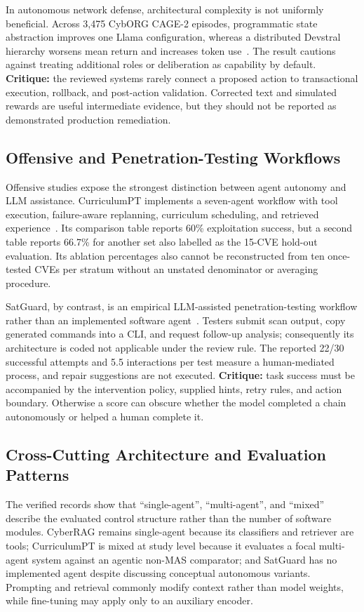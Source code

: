 In autonomous network defense, architectural complexity is not uniformly beneficial. Across 3,475 CybORG CAGE-2 episodes, programmatic state abstraction improves one Llama configuration, whereas a distributed Devstral hierarchy worsens mean return and increases token use~\cite{R0484_Bogdanov_2026}. The result cautions against treating additional roles or deliberation as capability by default. \textbf{Critique:} the reviewed systems rarely connect a proposed action to transactional execution, rollback, and post-action validation. Corrected text and simulated rewards are useful intermediate evidence, but they should not be reported as demonstrated production remediation.

\subsection{Offensive and Penetration-Testing Workflows}

Offensive studies expose the strongest distinction between agent autonomy and LLM assistance. CurriculumPT implements a seven-agent workflow with tool execution, failure-aware replanning, curriculum scheduling, and retrieved experience~\cite{R0322_Wu_2025}. Its comparison table reports 60\% exploitation success, but a second table reports 66.7\% for another set also labelled as the 15-CVE hold-out evaluation. Its ablation percentages also cannot be reconstructed from ten once-tested CVEs per stratum without an unstated denominator or averaging procedure.

SatGuard, by contrast, is an empirical LLM-assisted penetration-testing workflow rather than an implemented software agent~\cite{R0384_Xiao_2025}. Testers submit scan output, copy generated commands into a CLI, and request follow-up analysis; consequently its architecture is coded not applicable under the review rule. The reported 22/30 successful attempts and 5.5 interactions per test measure a human-mediated process, and repair suggestions are not executed. \textbf{Critique:} task success must be accompanied by the intervention policy, supplied hints, retry rules, and action boundary. Otherwise a score can obscure whether the model completed a chain autonomously or helped a human complete it.

\subsection{Cross-Cutting Architecture and Evaluation Patterns}

The verified records show that ``single-agent'', ``multi-agent'', and ``mixed'' describe the evaluated control structure rather than the number of software modules. CyberRAG remains single-agent because its classifiers and retriever are tools; CurriculumPT is mixed at study level because it evaluates a focal multi-agent system against an agentic non-MAS comparator; and SatGuard has no implemented agent despite discussing conceptual autonomous variants. Prompting and retrieval commonly modify context rather than model weights, while fine-tuning may apply only to an auxiliary encoder.

